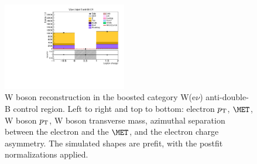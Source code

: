 \begin{figure}[tbp]
\begin{center}
    \includegraphics[width=0.48\textwidth]{figures/wlnhbb2016/boosted/WenWHTT1bFJCR_lepton1Charge.pdf}
    \caption{W boson reconstruction in the boosted category W(e$\nu$) anti-double-B control region.
    Left to right and top to bottom: electron $p_{\mathrm{T}}$, $\MET$, W boson $p_{\mathrm{T}}$, W boson transverse mass,
    azimuthal separation between the electron and the $\MET$, and the electron charge asymmetry.
    The simulated shapes are prefit, with the postfit normalizations applied.}
    \label{fig:boost_WenTT1b_WBosons}
  \end{center}
\end{figure}
\clearpage

